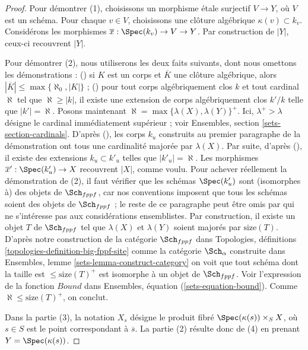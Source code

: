 \begin{proof}
Pour démontrer (1), choisissons un morphisme étale surjectif $V \to Y$, où
$V$ est un schéma. Pour chaque $v \in V$, choisissons une clôture algébrique
$\kappa(v) \subset k_v$. Considérons les morphismes
$\overline{x} : \Spec(k_v) \to V \to Y$.
Par construction de $|Y|$, ceux-ci recouvrent $|Y|$.

\medskip\noindent
Pour démontrer (2), nous utiliserons les deux faits suivants, dont nous omettons les démonstrations :
() si $K$ est un corps et $\overline{K}$ une clôture algébrique, alors
$|\overline{K}| \leq \max\{\aleph_0, |K|\}$ ;
() pour tout corps algébriquement clos $k$ et tout cardinal
$\aleph$ tel que $\aleph \geq |k|$, il existe une extension de corps
algébriquement clos $k'/k$ telle que $|k'| = \aleph$.
Posons maintenant $\aleph = \max\{\lambda(X), \lambda(Y)\}^+$.
Ici, $\lambda^+ > \lambda$ désigne le cardinal immédiatement supérieur ; voir
Ensembles, section \ref{sets-section-cardinals}.
D'après (),
les corps $k_u$ construits au premier paragraphe
de la démonstration ont tous une cardinalité majorée par $\lambda(X)$. Par suite,
d'après (), il existe des extensions $k_u \subset k'_u$ telles que
$|k'_u| = \aleph$. Les morphismes
$\overline{x}' : \Spec(k'_u) \to X$ recouvrent $|X|$, comme voulu.
Pour achever réellement la démonstration de (2), il faut vérifier que les schémas
$\Spec(k'_u)$ sont (isomorphes à) des objets de $\Sch_{fppf}$,
car nos conventions imposent que tous les schémas soient des objets de
$\Sch_{fppf}$ ; le reste de ce paragraphe peut être omis par
qui ne s'intéresse pas aux considérations ensemblistes. Par
construction, il existe un objet $T$ de $\Sch_{fppf}$ tel que
$\lambda(X)$ et $\lambda(Y)$ soient majorés par $\text{size}(T)$.
D'après notre construction de la catégorie $\Sch_{fppf}$ dans
Topologies, définitions \ref{topologies-definition-big-fppf-site}
comme la catégorie $\Sch_\alpha$ construite dans
Ensembles, lemme \ref{sets-lemma-construct-category}
on voit que tout schéma dont la taille est $\leq \text{size}(T)^+$
est isomorphe à un objet de $\Sch_{fppf}$. Voir
l'expression de la fonction $Bound$ dans
Ensembles, équation (\ref{sets-equation-bound}).
Comme $\aleph \leq \text{size}(T)^+$, on conclut.

\medskip\noindent
Dans la partie (3), la notation $X_s$ désigne
le produit fibré $\Spec(\kappa(s)) \times_S X$, où $s \in S$
est le point correspondant à $\overline{s}$. La partie (2) résulte donc
de (4) en prenant $Y = \Spec(\kappa(s))$.


\end{proof}
